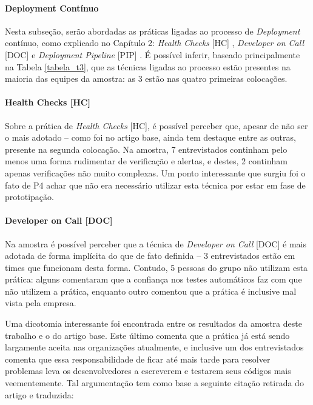 \paragraph{Deployment Contínuo}

Nesta subseção, serão abordadas as práticas ligadas ao processo de \emph{Deployment} contínuo, como explicado no Capítulo 2: \emph{Health Checks} [HC] \cite{devopsBook}, \emph{Developer on Call} [DOC] \cite{devAndDeploymentFB} e \emph{Deployment Pipeline} [PIP] \cite{devopsBook}. É possível inferir, baseado principalmente na Tabela \ref{tabela_t3}, que as técnicas ligadas ao processo estão presentes na maioria das equipes da amostra: as 3 estão nas quatro primeiras colocações. 

\paragraph{Health Checks [HC]}

Sobre a prática de \emph{Health Checks} [HC], é possível perceber que, apesar de não ser o mais adotado -- como foi no artigo base, ainda tem destaque entre as outras, presente na segunda colocação. Na amostra, 7 entrevistados continham pelo menos uma forma rudimentar de verificação e alertas, e destes, 2 continham apenas verificações não muito complexas. Um ponto interessante que surgiu foi o fato de P4 achar que não era necessário utilizar esta técnica por estar em fase de prototipação.

\paragraph{Developer on Call [DOC]}

Na amostra é possível perceber que a técnica de \emph{Developer on Call} [DOC] é mais adotada de forma implícita do que de fato definida -- 3 entrevistados estão em times que funcionam desta forma. Contudo, 5 pessoas do grupo não utilizam esta prática: alguns comentaram que a confiança nos testes automáticos faz com que não utilizem a prática, enquanto outro comentou que a prática é inclusive mal vista pela empresa.

Uma dicotomia interessante foi encontrada entre os resultados da amostra deste trabalho e o do artigo base. Este último comenta que a prática já está sendo largamente aceita nas organizações atualmente, e inclusive um dos entrevistados comenta que essa responsabilidade de ficar até mais tarde para resolver problemas leva os desenvolvedores a escreverem e testarem seus códigos mais veementemente. Tal argumentação tem como base a seguinte citação retirada do artigo e traduzida:

